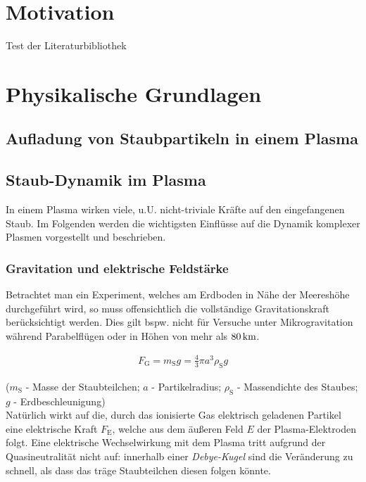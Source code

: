 \documentclass[numbers=noenddot,a4paper]{scrartcl}
\newcommand{\ix}[1]{_\text{#1}}
\newcommand{\tilt}[1]{\textit{#1}}
\begin{document}
	\thispagestyle{empty}
	
	\newpage
	
	\tableofcontents
	
	\newpage
	
	\section{Motivation}\label{sec:einleitung}
	
		Test der Literaturbibliothek \cite{Thomas94}
		
	\newpage
	
	\section{Physikalische Grundlagen}\label{sec:physg}
	
		\subsection{Aufladung von Staubpartikeln in einem Plasma}\label{subsec:ströme}
	
		\subsection{Staub-Dynamik im Plasma}\label{subsec:dynamik}
		
				In einem Plasma wirken viele, u.U. nicht-triviale Kräfte auf den eingefangenen Staub. Im Folgenden werden die wichtigsten Einflüsse auf die Dynamik komplexer Plasmen vorgestellt und beschrieben.\\
				
				\subsubsection{Gravitation und elektrische Feldstärke}\label{subsub:grav}
				
				Betrachtet man ein Experiment, welches am Erdboden in Nähe der Meereshöhe durchgeführt wird, so muss offensichtlich die vollständige Gravitationskraft berücksichtigt werden. Dies gilt bspw. nicht für Versuche unter Mikrogravitation während Parabelflügen oder in Höhen von mehr als $\unit[80]{km}$.
				
					\begin{align}
						F\ix{G}=m\ix{S} g=\frac{4}{3}\pi a^3 \rho\ix{S} g
					\end{align}
				
				($m\ix{S}$ - Masse der Staubteilchen; $a$ - Partikelradius; $\rho\ix{S}$ - Massendichte des Staubes; $g$ - \mbox{Erdbeschleunigung})\\
				Natürlich wirkt auf die, durch das ionisierte Gas elektrisch geladenen Partikel eine elektrische Kraft $F\ix{E}$, welche aus dem äußeren Feld $E$ der Plasma-Elektroden folgt. Eine elektrische Wechselwirkung mit dem Plasma tritt aufgrund der Quasineutralität nicht auf: innerhalb einer \tilt{Debye-Kugel} sind die Veränderung zu schnell, als dass das träge Staubteilchen diesen folgen könnte. 
				
\end{document}
